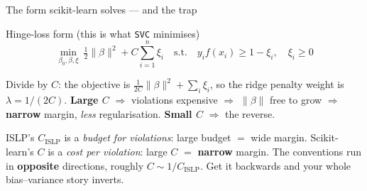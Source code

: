 \documentclass[aspectratio=169,11pt]{beamer}
\begin{document}
\begin{frame}{The form scikit-learn solves --- and the trap}
  \footnotesize
  \begin{block}{Hinge-loss form (this is what \texttt{SVC} minimises)}
    \[
      \boxed{\;
      \min_{\beta_0,\beta,\xi}\ \tfrac12\|\beta\|^2 + C\sum_{i=1}^{n}\xi_i
      \quad\text{s.t.}\quad
      y_i f(x_i)\ge 1-\xi_i,\quad \xi_i\ge0 \;}
    \]
  \end{block}
  \begin{readme}
    Divide by $C$: the objective is $\tfrac{1}{2C}\|\beta\|^2 + \sum_i \xi_i$,
    so the ridge penalty weight is $\lambda = 1/(2C)$.
    \textbf{Large $C$} $\Rightarrow$ violations expensive $\Rightarrow$
    $\|\beta\|$ free to grow $\Rightarrow$ \textbf{narrow} margin, \emph{less}
    regularisation. \textbf{Small $C$} $\Rightarrow$ the reverse.
  \end{readme}
  \begin{mistake}
    ISLP's $C_{\text{ISLP}}$ is a \emph{budget for violations}: large budget
    $=$ wide margin. Scikit-learn's $C$ is a \emph{cost per violation}: large
    $C$ $=$ \textbf{narrow} margin. The conventions run in \textbf{opposite}
    directions, roughly $C \sim 1/C_{\text{ISLP}}$. Get it backwards and your
    whole bias--variance story inverts.
  \end{mistake}
\end{frame}
\end{document}
